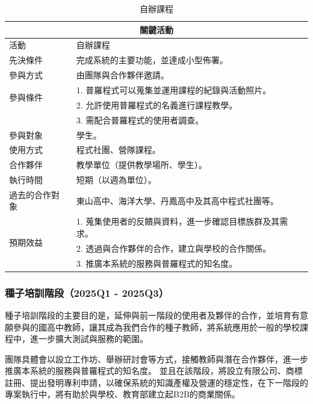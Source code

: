 \begin{table}[H]
  \centering
  \caption{自辦課程}
  \begin{tabular}{|l|l|}
      \hline
      \multicolumn{2}{|c|}{\textbf{關鍵活動}} \\ \hline
      活動 & 自辦課程 \\ \hline
      先決條件 & 完成系統的主要功能，並達成小型佈署。 \\ \hline
      參與方式 & 由團隊與合作夥伴邀請。 \\ \hline
      \multirow{2}{*}{參與條件} & 1. 普羅程式可以蒐集並運用課程的紀錄與活動照片。 \\
      & 2. 允許使用普羅程式的名義進行課程教學。 \\
      & 3. 需配合普羅程式的使用者調查。 \\ \hline
      參與對象 & 學生。 \\ \hline
      使用方式 & 程式社團、營隊課程。 \\ \hline 
      合作夥伴 & 教學單位（提供教學場所、學生）。 \\ \hline
      執行時間 & 短期（以週為單位）。 \\ \hline 
      過去的合作對象 & 東山高中、海洋大學、丹鳳高中及其高中程式社團等。 \\ \hline
      \multirow{3}{*}{預期效益} & 1. 蒐集使用者的反饋與資料，進一步確認目標族群及其需求。 \\
      & 2. 透過與合作夥伴的合作，建立與學校的合作關係。 \\
      & 3. 推廣本系統的服務與普羅程式的知名度。 \\ \hline
  \end{tabular}
\end{table}

\subsubsection{種子培訓階段（2025Q1 - 2025Q3）}

種子培訓階段的主要目的是，延伸與前一階段的使用者及夥伴的合作，並培育有意願參與的國高中教師，讓其成為我們合作的種子教師，將系統應用於一般的學校課程中，進一步擴大測試與服務的範圍。

團隊具體會以設立工作坊、舉辦研討會等方式，接觸教師與潛在合作夥伴，進一步推廣本系統的服務與普羅程式的知名度。
並且在該階段，將設立有限公司、商標註冊、提出發明專利申請，以確保系統的知識產權及營運的穩定性，在下一階段的專案執行中，將有助於與學校、教育部建立起B2B的商業關係。

